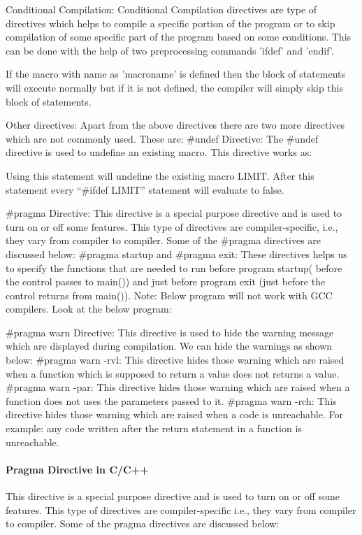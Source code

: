 Conditional Compilation: Conditional Compilation directives are type of directives which helps to compile a specific portion of the program or to skip compilation of some specific part of the program based on some conditions. This can be done with the help of two preprocessing commands 'ifdef' and 'endif'. 

If the macro with name as 'macroname' is defined then the block of statements will execute normally but if it is not defined, the compiler will simply skip this block of statements. 

Other directives: Apart from the above directives there are two more directives which are not commonly used. These are: 
\#undef Directive: The \#undef directive is used to undefine an existing macro. This directive works as:

Using this statement will undefine the existing macro LIMIT. After this statement every “\#ifdef LIMIT” statement will evaluate to false. 

\#pragma Directive: This directive is a special purpose directive and is used to turn on or off some features. This type of directives are compiler-specific, i.e., they vary from compiler to compiler. Some of the \#pragma directives are discussed below: 
\#pragma startup and \#pragma exit: These directives helps us to specify the functions that are needed to run before program startup( before the control passes to main()) and just before program exit (just before the control returns from main()). 
Note: Below program will not work with GCC compilers. 
Look at the below program:


\#pragma warn Directive: This directive is used to hide the warning message which are displayed during compilation. 
We can hide the warnings as shown below: 
\#pragma warn -rvl: This directive hides those warning which are raised when a function which is supposed to return a value does not returns a value.
\#pragma warn -par: This directive hides those warning which are raised when a function does not uses the parameters passed to it.
\#pragma warn -rch: This directive hides those warning which are raised when a code is unreachable. For example: any code written after the return statement in a function is unreachable.


\paragraph{Pragma Directive in C/C++}
This directive is a special purpose directive and is used to turn on or off some features. This type of directives are compiler-specific i.e., they vary from compiler to compiler. Some of the pragma directives are discussed below:

